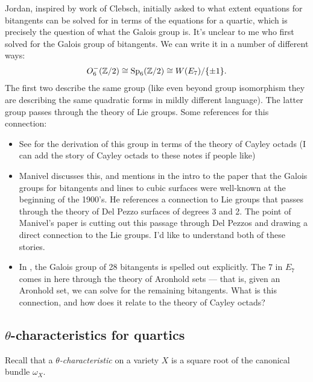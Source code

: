 \documentclass[11pt]{amsart}
\begin{document}
Jordan, inspired by work of Clebsch, initially asked to what extent equations for bitangents can be solved for in terms of the equations for a quartic, which is precisely the question of what the Galois group is. It's unclear to me who first solved for the Galois group of bitangents. We can write it in a number of different ways:
\begin{align*}
    O_6^-(\mathbb{Z}/2) \cong \mathrm{Sp}_6(\mathbb{Z}/2) \cong W(E_7)/\{\pm 1\}.
\end{align*}
The first two describe the same group (like even beyond group isomorphism they are describing the same quadratic forms in mildly different language). The latter group passes through the theory of Lie groups. Some references for this connection:
\begin{itemize}
    \item See \cite[Theorem~9]{DolgachevOrtland} for the derivation of this group in terms of the theory of Cayley octads (I can add the story of Cayley octads to these notes if people like)
    \item Manivel \cite{Manivel2006} discusses this, and mentions in the intro to the paper that the Galois groups for bitangents and lines to cubic surfaces were well-known at the beginning of the 1900's. He references a connection to Lie groups that passes through the theory of Del Pezzo surfaces of degrees 3 and 2. The point of Manivel's paper is cutting out this passage through Del Pezzos and drawing a direct connection to the Lie groups. I'd like to understand both of these stories.
    \item In \cite[p.~367]{MillerBlichfeldtDickson}, the Galois group of 28 bitangents is spelled out explicitly. The $7$ in $E_7$ comes in here through the theory of Aronhold sets --- that is, given an Aronhold set, we can solve for the remaining bitangents. What is this connection, and how does it relate to the theory of Cayley octads?
\end{itemize}

\subsection{\texorpdfstring{$\theta$}{theta}-characteristics for quartics}

Recall that a $\theta$\textit{-characteristic} on a variety $X$ is a square root of the canonical bundle $\omega_X$.
\end{document}
